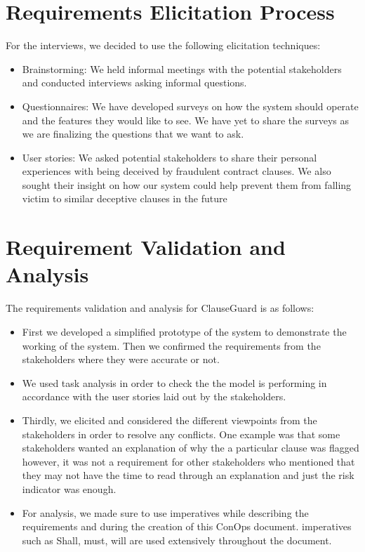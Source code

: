 \begin{itemize}
\begin{itemize}
    \end{itemize}
\end{itemize}



\section{Requirements Elicitation Process \label{Section::Requirements Elicitation Process} }
For the interviews, we decided to use the following elicitation techniques: 
\begin{itemize}
    \item Brainstorming: We held informal meetings with the potential stakeholders and conducted interviews asking informal questions. 
    \item Questionnaires: We have developed surveys on how the system should operate and the features they would like to see. We have yet to share the surveys as we are finalizing the questions that we want to ask.  
    \item User stories: We asked potential stakeholders to share their personal experiences with being deceived by fraudulent contract clauses. We also sought their insight on how our system could help prevent them from falling victim to similar deceptive clauses in the future
\end{itemize}


\section{ Requirement Validation and Analysis \label{Section::Requirement Validation and Analysis} }
The requirements validation and analysis for ClauseGuard is as follows: 
\begin{itemize}
    \item First we developed a simplified prototype of the system to demonstrate the working of the system. Then we confirmed the requirements from the stakeholders where they were accurate or not. 
    \item We used task analysis in order to check the the model is performing in accordance with the user stories laid out by the stakeholders. 
    \item Thirdly, we elicited and considered the different viewpoints from the stakeholders in order to resolve any conflicts. One example was that some stakeholders wanted an explanation of why the a particular clause was flagged however, it was not a requirement for other stakeholders who mentioned that they may not have the time to read through an explanation and just the risk indicator was enough. 
    \item For analysis, we made sure to use imperatives while describing the requirements and during the creation of this ConOps document. imperatives such as Shall, must, will are used extensively throughout the document. 
    \end{itemize}

